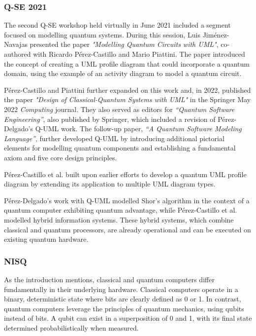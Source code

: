 \documentclass{article}
\begin{document}
{\subsubsection{Q-SE 2021}

The second Q-SE workshop held virtually in June 2021 included a segment focused on modelling quantum systems\cite{QSE2021}. During this session, Luis Jiménez-Navajas presented the paper \textit{"Modelling Quantum Circuits with UML"}\cite{Pérez-Castillo2021}, co-authored with Ricardo Pérez-Castillo and Mario Piattini. The paper introduced the concept of creating a UML profile diagram that could incorporate a quantum domain, using the example of an activity diagram to model a quantum circuit\cite{Pérez-Castillo2021}. 

Pérez-Castillo and Piattini further expanded on this work and, in 2022, published the paper \textit{"Design of Classical-Quantum Systems with UML"}\cite{Pérez-Castillo2022} in the Springer May 2022 \textit{Computing} journal\cite{Computing2022}. They also served as editors for \textit{“Quantum Software Engineering”}\cite{serrano2022quantum}, also published by Springer, which included a revision of Pérez-Delgado's Q-UML work. The follow-up paper, \textit{“A Quantum Software Modeling Language”}\cite{Pérez-Delgado2022}, further developed Q-UML by introducing additional pictorial elements for modelling quantum components and establishing a fundamental axiom and five core design principles.

Pérez-Castillo et al. built upon earlier efforts to develop a quantum UML profile diagram by extending its application to multiple UML diagram types. 

Pérez-Delgado's work with Q-UML modelled Shor's algorithm in the context of a quantum computer exhibiting quantum advantage, while Pérez-Castillo et al. modelled hybrid information systems. These hybrid systems, which combine classical and quantum processors, are already operational and can be executed on existing quantum hardware.

\subsubsection{NISQ}

As the introduction mentions, classical and quantum computers differ fundamentally in their underlying hardware. Classical computers operate in a binary, deterministic state where bits are clearly defined as 0 or 1. In contrast, quantum computers leverage the principles of quantum mechanics, using qubits instead of bits. A qubit can exist in a superposition of 0 and 1, with its final state determined probabilistically when measured. 

}
\end{document}
